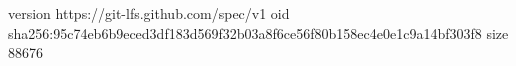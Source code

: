 version https://git-lfs.github.com/spec/v1
oid sha256:95c74eb6b9eced3df183d569f32b03a8f6ce56f80b158ec4e0e1c9a14bf303f8
size 88676

